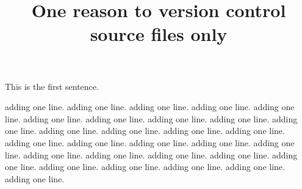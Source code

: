 \documentclass{article}
\title{One reason to version control source files only}
\begin{document}
\maketitle

This is the first sentence.

adding one line.
adding one line.
adding one line.
adding one line.
adding one line.
adding one line.
adding one line.
adding one line.
adding one line.
adding one line.
adding one line.
adding one line.
adding one line.
adding one line.
adding one line.
adding one line.
adding one line.
adding one line.
adding one line.
adding one line.
adding one line.
adding one line.
adding one line.
adding one line.
adding one line.
adding one line.
adding one line.
adding one line.
adding one line.
\end{document}
